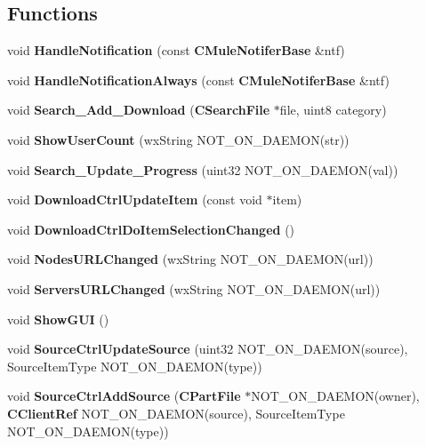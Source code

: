 \subsection*{Functions}
\begin{DoxyCompactItemize}
\item 
void {\bf HandleNotification} (const {\bf CMuleNotiferBase} \&ntf)
\item 
void {\bf HandleNotificationAlways} (const {\bf CMuleNotiferBase} \&ntf)\label{namespaceMuleNotify_a294b3f8a6976e42638c983a9271c8e46}

\item 
void {\bfseries Search\_\-Add\_\-Download} ({\bf CSearchFile} $\ast$file, uint8 category)\label{namespaceMuleNotify_ad5c93dc7325cf59f7f8f3b1694885ae1}

\item 
void {\bfseries ShowUserCount} (wxString NOT\_\-ON\_\-DAEMON(str))\label{namespaceMuleNotify_a914020a3d249985f52759c527b11e73f}

\item 
void {\bfseries Search\_\-Update\_\-Progress} (uint32 NOT\_\-ON\_\-DAEMON(val))\label{namespaceMuleNotify_a8d59722294e80bda7cab993675a4bd13}

\item 
void {\bfseries DownloadCtrlUpdateItem} (const void $\ast$item)\label{namespaceMuleNotify_a5a0b2bb8bba0258669ca2ff4b2b8c272}

\item 
void {\bfseries DownloadCtrlDoItemSelectionChanged} ()\label{namespaceMuleNotify_aaa3c0ba581f325e3d71abd559d86d63a}

\item 
void {\bfseries NodesURLChanged} (wxString NOT\_\-ON\_\-DAEMON(url))\label{namespaceMuleNotify_a00eb24edb2d02e1d62f1fbb1bc934826}

\item 
void {\bfseries ServersURLChanged} (wxString NOT\_\-ON\_\-DAEMON(url))\label{namespaceMuleNotify_a9f59e9178b4097cb16c25782ce27c90a}

\item 
void {\bfseries ShowGUI} ()\label{namespaceMuleNotify_af2f719afd8b0b60a49fedae7db6ac74c}

\item 
void {\bfseries SourceCtrlUpdateSource} (uint32 NOT\_\-ON\_\-DAEMON(source), SourceItemType NOT\_\-ON\_\-DAEMON(type))\label{namespaceMuleNotify_a7195e9f363aa8841be2d619317ef7221}

\item 
void {\bfseries SourceCtrlAddSource} ({\bf CPartFile} $\ast$NOT\_\-ON\_\-DAEMON(owner), {\bf CClientRef} NOT\_\-ON\_\-DAEMON(source), SourceItemType NOT\_\-ON\_\-DAEMON(type))\label{namespaceMuleNotify_a3af056ada1002e47e1d16924d78cf8d4}


\end{DoxyCompactItemize}
